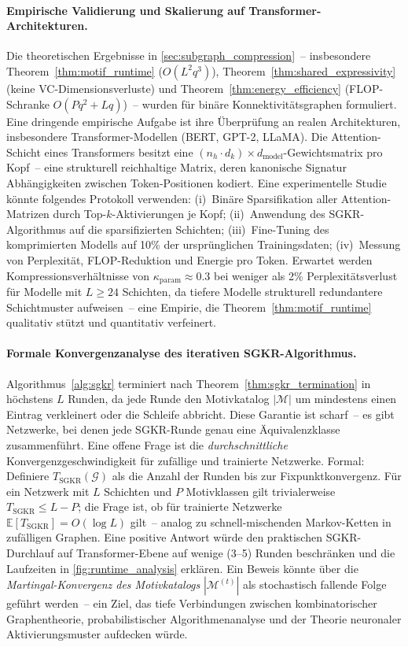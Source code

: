 ﻿\documentclass[12pt, a4paper, openany]{report}
\newcommand{\E}{\mathbb{E}}
\newcommand{\calG}{\mathcal{G}}
\newcommand{\calM}{\mathcal{M}}
\begin{document}
\paragraph{Empirische Validierung und Skalierung auf Transformer-Architekturen.}
Die theoretischen Ergebnisse in \cref{sec:subgraph_compression}~-- insbesondere
Theorem~\ref{thm:motif_runtime} ($O(L^2 q^3)$),
Theorem~\ref{thm:shared_expressivity} (keine VC-Dimensionsverluste) und
Theorem~\ref{thm:energy_efficiency} (FLOP-Schranke $O(Pq^2 + Lq)$)~-- wurden
für binäre Konnektivitätsgraphen formuliert.  Eine dringende empirische
Aufgabe ist ihre Überprüfung an realen Architekturen, insbesondere
Transformer-Modellen (BERT, GPT-2, LLaMA).  Die Attention-Schicht eines
Transformers besitzt eine $(n_h \cdot d_k) \times d_{\mathrm{model}}$-Gewichts\-matrix
pro Kopf~-- eine strukturell reichhaltige Matrix, deren kanonische Signatur
Abhängigkeiten zwischen Token-Positionen kodiert.  Eine experimentelle
Studie könnte folgendes Protokoll verwenden: (i)~Binäre Sparsifikation aller
Attention-Matrizen durch Top-$k$-Aktivierungen je Kopf; (ii)~Anwendung
des SGKR-Algorithmus auf die sparsifizierten Schichten; (iii)~Fine-Tuning
des komprimierten Modells auf 10\% der ursprünglichen Trainingsdaten;
(iv)~Messung von Perplexität, FLOP-Reduktion und Energie pro Token.
Erwartet werden Kompressionsverhältnisse von
$\kappa_{\mathrm{param}} \approx 0.3$ bei weniger als 2\% Perplexitätsverlust
für Modelle mit $L \geq 24$ Schichten, da tiefere Modelle strukturell
redundantere Schichtmuster aufweisen~-- eine Empirie, die
Theorem~\ref{thm:motif_runtime} qualitativ stützt und quantitativ verfeinert.

\paragraph{Formale Konvergenzanalyse des iterativen SGKR-Algorithmus.}
Algorithmus~\ref{alg:sgkr} terminiert nach Theorem~\ref{thm:sgkr_termination}
in höchstens $L$ Runden, da jede Runde den Motivkatalog $|\calM|$ um mindestens
einen Eintrag verkleinert oder die Schleife abbricht.  Diese Garantie ist
scharf~-- es gibt Netzwerke, bei denen jede SGKR-Runde genau eine
Äquivalenzklasse zusammenführt.  Eine offene Frage ist die
\emph{durchschnittliche} Konvergenzgeschwindigkeit für zufällige und
trainierte Netzwerke.  Formal: Definiere $T_{\mathrm{SGKR}}(\calG)$ als die
Anzahl der Runden bis zur Fixpunktkonvergenz.  Für ein Netzwerk mit $L$
Schichten und $P$ Motivklassen gilt trivialerweise $T_{\mathrm{SGKR}} \leq
L - P$; die Frage ist, ob für trainierte Netzwerke
$\E[T_{\mathrm{SGKR}}] = O(\log L)$ gilt~-- analog zu schnell-mischenden
Markov-Ketten in zufälligen Graphen.  Eine positive Antwort würde den
praktischen SGKR-Durchlauf auf Transformer-Ebene auf wenige (3--5) Runden
beschränken und die Laufzeiten in \cref{fig:runtime_analysis} erklären.  Ein
Beweis könnte über die \emph{Martingal-Konvergenz des Motivkatalogs}
$|\calM^{(t)}|$ als stochastisch fallende Folge geführt werden~-- ein Ziel,
das tiefe Verbindungen zwischen kombinatorischer Graphentheorie,
probabilistischer Algorithmenanalyse und der Theorie neuronaler
Aktivierungsmuster aufdecken würde.
\end{document}
